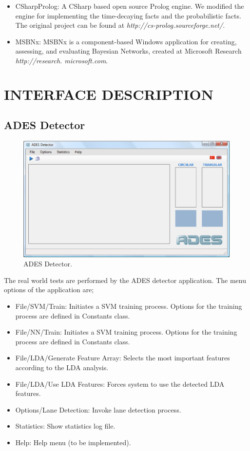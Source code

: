 \documentclass[a4paper,oneside,12pt]{report}
\begin{document}
\begin{itemize}
	\item CSharpProlog: A CSharp based open source Prolog engine. We modified the engine for implementing the time-decaying facts and the probabilistic facts. The original project can be found at \textit{http://cs-prolog.sourceforge.net/}.
	\item MSBNx: MSBNx is a component-based Windows application for creating, assessing, and evaluating Bayesian Networks, created at Microsoft Research \textit{http://research. microsoft.com}.
\end{itemize}

\section{INTERFACE DESCRIPTION}
\subsection{ADES Detector}
\begin{figure}
\begin{center}
\includegraphics[width=140mm]{img/adesdetectorapp.eps}
\caption{ADES Detector.}
\label{fig:adesdetectorapp}
\end{center}
\end{figure}
The real world tests are performed by the ADES detector application. The menu options of the application are;

\begin{itemize}
	\item File/SVM/Train: Initiates a SVM training process. Options for the training process are defined in Constants class.
	\item File/NN/Train: Initiates a SVM training process. Options for the training process are defined in Constants class.
	\item File/LDA/Generate Feature Array: Selects the most important features according to the LDA analysis.
	\item File/LDA/Use LDA Features: Forces system to use the detected LDA features.
	\item Options/Lane Detection: Invoke lane detection process.
	\item Statistics: Show statistics log file.
	\item Help: Help menu (to be implemented).
\end{itemize}
\end{document}
